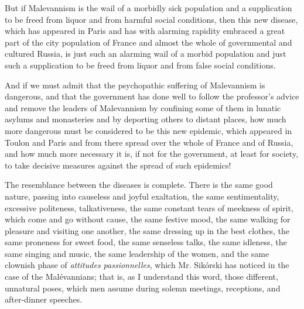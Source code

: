 \documentclass{book}
\begin{document}
But if Malevannism is the wail of a morbidly sick population and a supplication to be freed from liquor and from harmful social conditions, then this new disease, which has appeared in Paris and has with alarming rapidity embraced a great part of the city population of France and almost the whole of governmental and cultured Russia, is just such an alarming wail of a morbid population and just such a supplication to be freed from liquor and from false social conditions.

And if we must admit that the psychopathic suffering of Malevannism is dangerous, and that the government has done well to follow the professor’s advice and remove the leaders of Malevannism by confining some of them in lunatic asylums and monasteries and by deporting others to distant places, how much more dangerous must be considered to be this new epidemic, which appeared in Toulon and Paris and from there spread over the whole of France and of Russia, and how much more necessary it is, if not for the government, at least for society, to take decisive measures against the spread of such epidemics!

The resemblance between the diseases is complete. There is the same good nature, passing into causeless and joyful exaltation, the same sentimentality, excessive politeness, talkativeness, the same constant tears of meekness of spirit, which come and go without cause, the same festive mood, the same walking for pleasure and visiting one another, the same dressing up in the best clothes, the same proneness for sweet food, the same senseless talks, the same idleness, the same singing and music, the same leadership of the women, and the same clownish phase of \emph{attitudes passionnelles}, which Mr. Sikórski has noticed in the case of the Malévannians; that is, as I understand this word, those different, unnatural poses, which men assume during solemn meetings, receptions, and after-dinner speeches.
\end{document}
